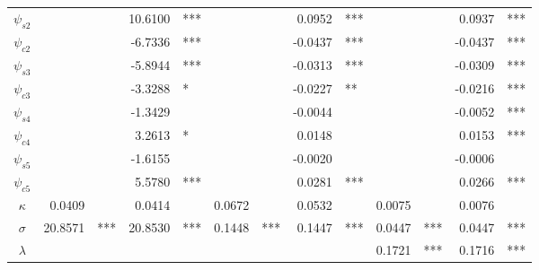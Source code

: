\documentclass[3p]{elsarticle}
\begin{document}
\begin{table}[]
\begin{tabular}{crlrlrlrlrlrl}
\multicolumn{1}{c|}{$\psi_{s2}$}   &                 &           & 10.6100         & ***       &                &            & 0.0952         & ***        &                &            & 0.0937         & ***       \\
\multicolumn{1}{c|}{$\psi_{c2}$}   &                 &           & -6.7336         & ***       &                &            & -0.0437        & ***        &                &            & -0.0437        & ***       \\
\multicolumn{1}{c|}{$\psi_{s3}$}   &                 &           & -5.8944         & ***       &                &            & -0.0313        & ***        &                &            & -0.0309        & ***       \\
\multicolumn{1}{c|}{$\psi_{c3}$}   &                 &           & -3.3288         & *         &                &            & -0.0227        & **         &                &            & -0.0216        & ***       \\
\multicolumn{1}{c|}{$\psi_{s4}$}   &                 &           & -1.3429         &           &                &            & -0.0044        &            &                &            & -0.0052        & ***       \\
\multicolumn{1}{c|}{$\psi_{c4}$}   &                 &           & 3.2613          & *         &                &            & 0.0148         &            &                &            & 0.0153         & ***       \\
\multicolumn{1}{c|}{$\psi_{s5}$}   &                 &           & -1.6155         &           &                &            & -0.0020        &            &                &            & -0.0006        &           \\
\multicolumn{1}{c|}{$\psi_{c5}$}   &                 &           & 5.5780          & ***       &                &            & 0.0281         & ***        &                &            & 0.0266         & ***       \\
\multicolumn{1}{c|}{$\kappa$}    & 0.0409          &           & 0.0414          &           & 0.0672         &            & 0.0532         &            & 0.0075         &            & 0.0076          &           \\
\multicolumn{1}{c|}{$\sigma$}    & 20.8571         & ***          & 20.8530         & ***          & 0.1448         & ***           & 0.1447         & ***           & 0.0447        & ***           & 0.0447         & ***           \\
\multicolumn{1}{c|}{$\lambda$}   &                 &           &                 &           &                &            &                &            & 0.1721         & ***           & 0.1716          & ***          \\

\end{tabular}
\end{table}
\end{document}
